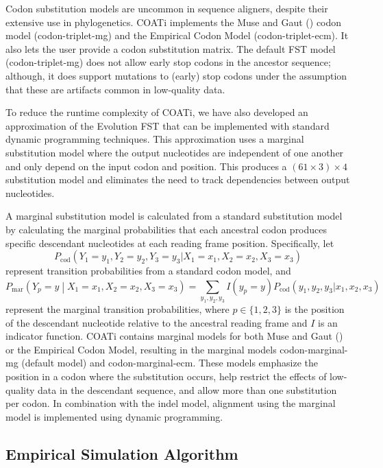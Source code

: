 \documentclass[12pt,letterpaper]{article}
\begin{document}
Codon substitution models are uncommon in sequence aligners, despite their extensive use in phylogenetics.
COATi implements the Muse and Gaut (\citeyear{muse_gaut_1994}) codon model (codon-triplet-mg) and the Empirical Codon Model \citep{kosiol_ECM_2007} (codon-triplet-ecm).
It also lets the user provide a codon substitution matrix.
The default FST model (codon-triplet-mg) does not allow early stop codons in the ancestor sequence; although, it does support mutations to (early) stop codons under the assumption that these are artifacts common in low-quality data.

To reduce the runtime complexity of COATi, we have also developed an approximation of the Evolution FST that can be implemented with standard dynamic programming techniques. This approximation uses a marginal substitution model where the output nucleotides are independent of one another and only depend on the input codon and position. This produces a $\left(61 \times 3 \right) \times 4$ substitution model and eliminates the need to track dependencies between output nucleotides.

A marginal substitution model is calculated from a standard substitution model by calculating the marginal probabilities that each ancestral codon produces specific descendant nucleotides at each reading frame position.
%
Specifically, let
\[
P_\text{cod}\left( Y_1 = y_1, Y_2 = y_2, Y_3 = y_3 |
                   X_1 = x_1, X_2 = x_2, X_3 = x_3 \right)
\]
represent transition probabilities from a standard codon model, and
%
\[
P_\text{mar}\left(Y_p = y \middle| X_1 = x_1, X_2 = x_2, X_3 = x_3 \right)
=
\sum_{y_1, y_2, y_3} I(y_p = y)
P_\text{cod}\left( y_1, y_2, y_3 |
                   x_1, x_2, x_3 \right)
\]
%
represent the marginal transition probabilities, where
$p \in \{1, 2, 3\}$ is the position of the descendant nucleotide relative to the ancestral reading frame and $I$ is an indicator function.
COATi contains marginal models for both Muse and Gaut (\citeyear{muse_gaut_1994}) or the Empirical Codon Model, resulting in the marginal models codon-marginal-mg (default model) and codon-marginal-ecm.
These models emphasize the position in a codon where the substitution occurs, help restrict the effects of low-quality data in the descendant sequence, and allow more than one substitution per codon.
In combination with the indel model, alignment using the marginal model is implemented using dynamic programming.


\subsection*{Empirical Simulation Algorithm}
\end{document}
